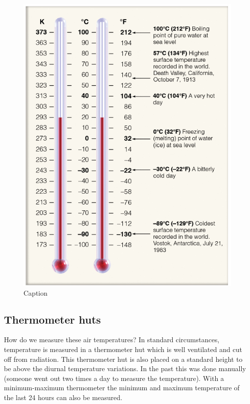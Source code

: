 \documentclass[12pt,oneside]{book}
\begin{document}
\begin{figure}

{\centering \includegraphics[width=1\linewidth]{figures/Figure220} 

}

\caption{Caption}\label{fig:TempScale}
\end{figure}

\subsection{Thermometer huts}\label{thermometer-huts}

How do we measure these air temperatures? In standard circumstances,
temperature is measured in a thermometer hut which is well ventilated
and cut off from radiation. This thermometer hut is also placed on a
standard height to be above the diurnal temperature variations. In the
past this was done manually (someone went out two times a day to measure
the temperature). With a minimum-maximum thermometer the minimum and
maximum temperature of the last 24 hours can also be measured.
\end{document}
